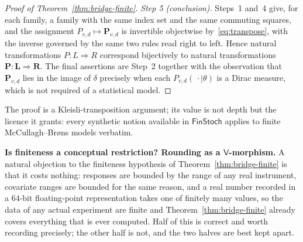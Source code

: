 \documentclass[11pt,a4paper]{article}
\theoremstyle{plain}
\theoremstyle{definition}
\theoremstyle{remark}
\newcommand{\cat}[1]{\mathsf{#1}}
\newcommand{\catV}{\cat{V}}
\newcommand{\FinStoch}{\cat{FinStoch}}
\newcommand{\del}{\delta}
\begin{document}
\begin{proof}[Proof of Theorem~\ref{thm:bridge-finite}]
\emph{Step 5 (conclusion).} Steps~1 and~4 give, for each family, a family with
the same index set and the same commuting squares, and the assignment
$P_{v,d} \mapsto \mathbf{P}_{v,d}$ is invertible objectwise
by~\eqref{eq:transpose}, with the inverse governed by the same two rules read
right to left. Hence natural transformations $P \colon L \Rightarrow R$
correspond bijectively to natural transformations
$\mathbf{P} \colon \mathbf{L} \Rightarrow \mathbf{R}$. The final assertions
are Step~2 together with the observation that $\mathbf{P}_{v,d}$ lies in the
image of $\del$ precisely when each $P_{v,d}(\,\cdot \mid \theta)$ is a Dirac
measure, which is not required of a statistical model.
\end{proof}

The proof is a Kleisli-transposition argument; its value is not depth but the
licence it grants: every synthetic notion available in $\FinStoch$ applies to
finite McCullagh--Br\o ns models verbatim.



\medskip
\noindent\textbf{Is finiteness a conceptual restriction? Rounding as a
$\catV$-morphism.}
A natural objection to the finiteness hypothesis of
Theorem~\ref{thm:bridge-finite} is that it costs nothing: responses are
bounded by the range of any real instrument, covariate ranges are bounded for
the same reason, and a real number recorded in a $64$-bit floating-point
representation takes one of finitely many values, so the data of any actual
experiment are finite and Theorem~\ref{thm:bridge-finite} already covers
everything that is ever computed. Half of this is correct and worth recording
precisely; the other half is not, and the two halves are best kept apart.
\end{document}
